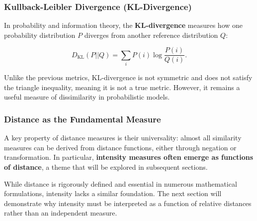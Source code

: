 \subsubsection{Kullback-Leibler Divergence (KL-Divergence)}
In probability and information theory, the \textbf{KL-divergence} measures how one probability distribution \( P \) diverges from another reference distribution \( Q \):

\[
D_{\text{KL}}(P || Q) = \sum_i P(i) \log \frac{P(i)}{Q(i)}.
\]

Unlike the previous metrics, KL-divergence is not symmetric and does not satisfy the triangle inequality, meaning it is not a true metric. However, it remains a useful measure of dissimilarity in probabilistic models.

\subsubsection{Distance as the Fundamental Measure}

A key property of distance measures is their universality: almost all similarity measures can be derived from distance functions, either through negation or transformation. In particular, \textbf{intensity measures often emerge as functions of distance}, a theme that will be explored in subsequent sections.

While distance is rigorously defined and essential in numerous mathematical formulations, intensity lacks a similar foundation. The next section will demonstrate why intensity must be interpreted as a function of relative distances rather than an independent measure.

